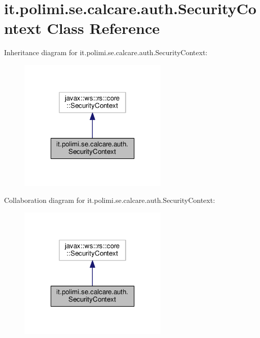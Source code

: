 \hypertarget{classit_1_1polimi_1_1se_1_1calcare_1_1auth_1_1SecurityContext}{}\section{it.\+polimi.\+se.\+calcare.\+auth.\+Security\+Context Class Reference}
\label{classit_1_1polimi_1_1se_1_1calcare_1_1auth_1_1SecurityContext}


Inheritance diagram for it.\+polimi.\+se.\+calcare.\+auth.\+Security\+Context\+:
\nopagebreak
\begin{figure}[H]
\begin{center}
\leavevmode
\includegraphics[width=202pt]{classit_1_1polimi_1_1se_1_1calcare_1_1auth_1_1SecurityContext__inherit__graph}
\end{center}
\end{figure}


Collaboration diagram for it.\+polimi.\+se.\+calcare.\+auth.\+Security\+Context\+:
\nopagebreak
\begin{figure}[H]
\begin{center}
\leavevmode
\includegraphics[width=202pt]{classit_1_1polimi_1_1se_1_1calcare_1_1auth_1_1SecurityContext__coll__graph}
\end{center}
\end{figure}
